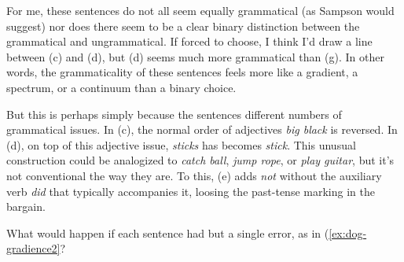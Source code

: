 For me, these sentences do not all seem equally grammatical (as Sampson would suggest) nor does there seem to be a clear binary distinction between the grammatical and ungrammatical. If forced to choose, I think I'd draw a line between (c) and (d), but (d) seems much more grammatical than (g). In other words, the grammaticality of these sentences feels more like a gradient, a spectrum, or a continuum than a binary choice.

But this is perhaps simply because the sentences different numbers of grammatical issues. In (c), the normal order of adjectives \textit{big black} is reversed. In (d), on top of this adjective issue, \textit{sticks} has becomes \textit{stick}. This unusual construction could be analogized to \textit{catch ball}, \textit{jump rope}, or \textit{play guitar}, but it's not conventional the way they are. To this, (e) adds \textit{not} without the auxiliary verb \textit{did} that typically accompanies it, loosing the past-tense marking in the bargain.

What would happen if each sentence had but a single error, as in (\ref{ex:dog-gradience2}?

\ea \label{ex:dog-gradience2}
 \z
\z




